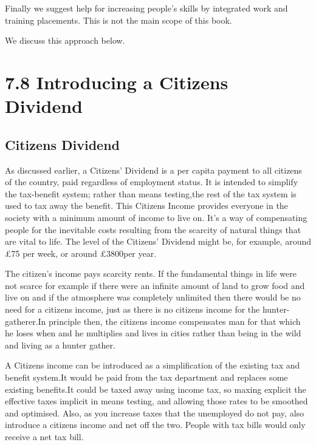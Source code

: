 \documentclass[]{tufte-handout}
\begin{document}
Finally we suggest help for increasing people's skills by integrated
work and training placements. This is not the main scope of this book.

We discuss this approach below.

\hypertarget{introducing-a-citizens-dividend}{%
\section{7.8 Introducing a Citizens
Dividend}\label{introducing-a-citizens-dividend}}

\hypertarget{citizens-dividend}{%
\subsection{Citizens Dividend}\label{citizens-dividend}}

As discussed earlier, a Citizens' Dividend is a per capita payment to
all citizens of the country, paid regardless of employment status. It is
intended to simplify the tax-benefit system; rather than means
testing,the rest of the tax system is used to tax away the benefit. This
Citizens Income provides everyone in the society with a minimum amount
of income to live on. It's a way of compensating people for the
inevitable costs resulting from the scarcity of natural things that are
vital to life. The level of the Citizens' Dividend might be, for
example, around £75 per week, or around £3800per year.

The citizen's income pays scarcity rents. If the fundamental things in
life were not scarce for example if there were an infinite amount of
land to grow food and live on and if the atmosphere was completely
unlimited then there would be no need for a citizens income, just as
there is no citizens income for the hunter-gatherer.In principle then,
the citizens income compensates man for that which he loses when and he
multiplies and lives in cities rather than being in the wild and living
as a hunter gather.

A Citizens income can be introduced as a simplification of the existing
tax and benefit system.It would be paid from the tax department and
replaces some existing benefits.It could be taxed away using income tax,
so maxing explicit the effective taxes implicit in means testing, and
allowing those rates to be smoothed and optimised. Also, as you increase
taxes that the unemployed do not pay, also introduce a citizens income
and net off the two. People with tax bills would only receive a net tax
bill.
\end{document}
